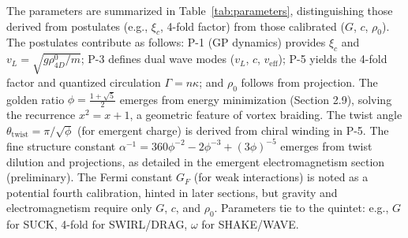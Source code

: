 
The parameters are summarized in Table~\ref{tab:parameters}, distinguishing those derived from postulates (e.g., $\xi_c$, 4-fold factor) from those calibrated ($G$, $c$, $\rho_0$). The postulates contribute as follows: P-1 (GP dynamics) provides $\xi_c$ and $v_L = \sqrt{g \rho_{4D}^0 / m}$; P-3 defines dual wave modes ($v_L$, $c$, $v_{\text{eff}}$); P-5 yields the 4-fold factor and quantized circulation $\Gamma = n \kappa$; and $\rho_0$ follows from projection. The golden ratio $\phi = \frac{1 + \sqrt{5}}{2}$ emerges from energy minimization (Section 2.9), solving the recurrence $x^2 = x + 1$, a geometric feature of vortex braiding. The twist angle $\theta_{\text{twist}} = \pi / \sqrt{\phi}$ (for emergent charge) is derived from chiral winding in P-5. The fine structure constant $\alpha^{-1} = 360 \phi^{-2} - 2 \phi^{-3} + (3 \phi)^{-5}$ emerges from twist dilution and projections, as detailed in the emergent electromagnetism section (preliminary). The Fermi constant $G_F$ (for weak interactions) is noted as a potential fourth calibration, hinted in later sections, but gravity and electromagnetism require only $G$, $c$, and $\rho_0$. Parameters tie to the quintet: e.g., $G$ for SUCK, 4-fold for SWIRL/DRAG, $\omega$ for SHAKE/WAVE.

